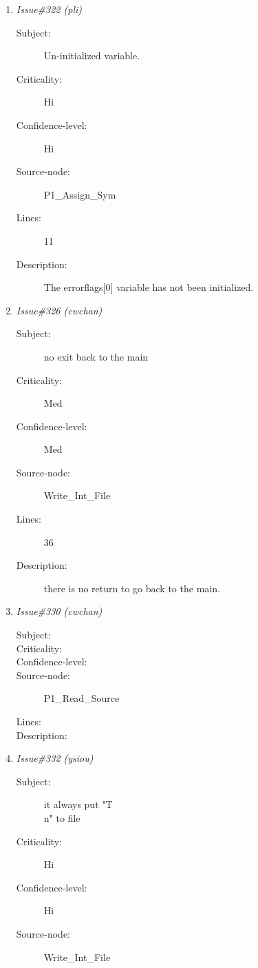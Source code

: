 \begin{enumerate}
\begin{description}
\item [Lines:] 4-5

\item [Description:] The variable should be defined as an array
of BOOLEAN since that is how it is used within this procedure.
\end{description}
\item {\it Issue\#322 (pli)}
\begin{description}
\item [Subject:] Un-initialized variable.
\item [Criticality:] Hi
\item [Confidence-level:] Hi
\item [Source-node:] P1\_Assign\_Sym

\item [Lines:] 11

\item [Description:] The errorflags[0] variable has not been
initialized.
\end{description}
\item {\it Issue\#326 (cwchan)}
\begin{description}
\item [Subject:] no exit back to the main
\item [Criticality:] Med
\item [Confidence-level:] Med
\item [Source-node:] Write\_Int\_File

\item [Lines:] 36

\item [Description:] there is no return to go back to the main.
\end{description}
\item {\it Issue\#330 (cwchan)}
\begin{description}
\item [Subject:] 
\item [Criticality:] 
\item [Confidence-level:] 
\item [Source-node:] P1\_Read\_Source

\item [Lines:] 

\item [Description:] 
\end{description}
\item {\it Issue\#332 (ysiou)}
\begin{description}
\item [Subject:] it always put "T\\n" to file
\item [Criticality:] Hi
\item [Confidence-level:] Hi
\item [Source-node:] Write\_Int\_File


\end{description}
\end{enumerate}
